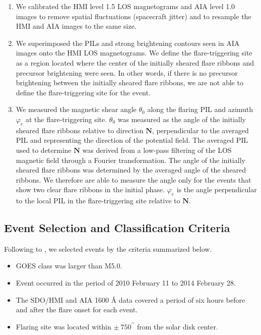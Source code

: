 \documentclass[10pt,preprint2]{aastex}
\begin{document}
\renewcommand{\theenumi}{\arabic{enumi}}
\begin{enumerate}

	\item We calibrated the HMI level 1.5 LOS magnetograms and AIA level 1.0 images to remove spatial fluctuations (spacecraft jitter) and to resample the HMI and AIA images to the same size.
	
	\item We superimposed the PILs and strong brightening contours seen in AIA images onto the HMI LOS magnetograms. We define the flare-triggering site as a region located where the center of the initially sheared flare ribbons and precursor brightening were seen. In other words, if there is no precursor brightening between the initially sheared flare ribbons, we are not able to define the flare-triggering site for the event.
		
	\item We measured the magnetic shear angle $\theta_{0}$ along the flaring PIL and azimuth $\varphi_{e}$ at the flare-triggering site. $\theta_{0}$ was measured as the angle of the initially sheared flare ribbons relative to direction $\bm{N}$, perpendicular to the averaged PIL and representing the direction of the potential field. The averaged PIL used to determine $\bm{N}$ was derived from a low-pass filtering of the LOS magnetic field through a Fourier transformation. The angle of the initially sheared flare ribbons was determined by the averaged angle of the sheared ribbons. We therefore are able to measure the angle only for the events that show two clear flare ribbons in the initial phase. $\varphi_{e}$ is the angle perpendicular to the local PIL in the flare-triggering site relative to $\bm{N}$.
		
\end{enumerate}

\subsection{Event Selection and Classification Criteria} \label{sec:criteria}

Following to \citet{bamba13}, we selected events by the criteria summarized below.

\begin{itemize}
	\item GOES class was larger than M5.0.
	\item Event occurred in the period of 2010 February 11 to 2014 February 28.
	\item The SDO/HMI and AIA 1600 {\AA} data covered a period of six hours before and after the flare onset for each event.
	\item Flaring site was located within $\pm~750^{\prime\prime}$ from the solar disk center.
\end{itemize}
\end{document}
